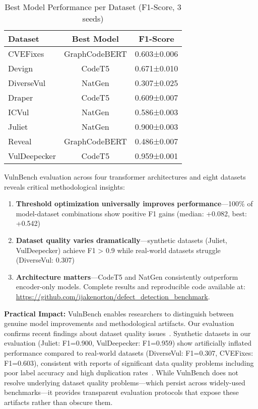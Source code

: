 \documentclass[letterpaper]{article}
\begin{document}
\begin{table}[ht]
	\centering
	\caption{Best Model Performance per Dataset (F1-Score, 3 seeds)}
	\label{tab:results}
	\begin{tabular}{lcc}
		\toprule
		Dataset      & Best Model    & F1-Score    \\
		\midrule
		CVEFixes     & GraphCodeBERT & 0.603±0.006 \\
		Devign       & CodeT5        & 0.671±0.010 \\
		DiverseVul   & NatGen        & 0.307±0.025 \\
		Draper       & CodeT5        & 0.609±0.007 \\
		ICVul        & NatGen        & 0.586±0.003 \\
		Juliet       & NatGen        & 0.900±0.003 \\
		Reveal       & GraphCodeBERT & 0.486±0.007 \\
		VulDeepecker & CodeT5        & 0.959±0.001 \\
		\bottomrule
	\end{tabular}
\end{table}

VulnBench evaluation across four transformer architectures and eight datasets reveals critical methodological insights:
\begin{enumerate}
	\item \textbf{Threshold optimization universally improves performance}---100\% of model-dataset combinations show positive F1 gains (median: +0.082, best: +0.542)
	\item \textbf{Dataset quality varies dramatically}---synthetic datasets (Juliet, VulDeepecker) achieve F1 > 0.9 while real-world datasets struggle (DiverseVul: 0.307)
	\item \textbf{Architecture matters}---CodeT5 and NatGen consistently outperform encoder-only models. Complete results and reproducible code available at: \url{https://github.com/ijakenorton/defect_detection_benchmark}.
\end{enumerate}

\textbf{Practical Impact:} VulnBench enables researchers to distinguish between genuine model improvements and methodological artifacts. Our evaluation confirms recent findings about dataset quality issues~\citep{ding2024vulnerability,chen2023diversevul}. Synthetic datasets in our evaluation (Juliet: F1=0.900, VulDeepecker: F1=0.959) show artificially inflated performance compared to real-world datasets (DiverseVul: F1=0.307, CVEFixes: F1=0.603), consistent with reports of significant data quality problems including poor label accuracy and high duplication rates~\cite{ding2024vulnerability}. While VulnBench does not resolve underlying dataset quality problems---which persist across widely-used benchmarks---it provides transparent evaluation protocols that expose these artifacts rather than obscure them.
\end{document}
